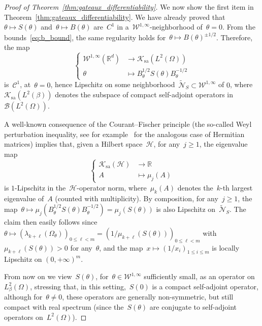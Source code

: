 \documentclass[a4]{article}
\newcommand{\R}{\mathbb{R}}
\newcommand{\1}{\mathbbm 1}
\newcommand{\Winf}{{{\cW}^{1,\infty}}}
\newcommand{\cW}{\mathcal{W}}
\begin{document}
\begin{proof}[Proof of Theorem~\ref{thm:gateaux_differentiability}]
    We now show the first item in Theorem~\ref{thm:gateaux_differentiability}. We have already proved that~$\theta\mapsto S(\theta)$ and~$\theta\mapsto B(\theta)$ are~$C^1$ in a~$\Winf$-neighborhood of~$\theta=0$. From the bounds~\eqref{eq:b_bound}, the same regularity holds for~$\theta\mapsto B(\theta)^{\pm1/2}$. Therefore, the map
    \begin{equation}
        \left\{\begin{aligned}\Winf(\R^d)&\to \mathcal K_{\mathrm{sa}}(L^2(\Omega))\\
            \theta&\mapsto B_\theta^{1/2}S(\theta)B_\theta^{-1/2}\end{aligned}\right.
    \end{equation}
    is~$\mathcal C^1$, at~$\theta=0$, hence Lipschitz on some neighborhood~$\widetilde{\mathcal N}_{S}\subset \Winf$ of $0$, where~$\mathcal K_{\mathrm{sa}}(L^2(\beta))$ denotes the subspace of compact self-adjoint operators in~$\mathcal B(L^2(\Omega))$.

    A well-known consequence of the Courant--Fischer principle (the so-called Weyl perturbation inequality, see for example~\cite[Section 1.3.3]{T12} for the analogous case of Hermitian matrices) implies that, given a Hilbert space~$\mathcal H$, for any~$j\geq 1$, the eigenvalue map
    \begin{equation}
        \left\{\begin{aligned} \mathcal K_{\mathrm{sa}}(\mathcal H)&\to \R\\
            A&\mapsto \mu_j(A)\end{aligned}\right.
    \end{equation}
    is $1$-Lipschitz in the~$\mathcal H$-operator norm, where~$\mu_k(A)$ denotes the~$k$-th largest eigenvalue of~$A$ (counted with multiplicity). By composition, for any~$j\geq 1$, the map~$\theta\mapsto \mu_j(B_\theta^{1/2}S(\theta)B_\theta^{-1/2}) = \mu_j(S(\theta))$ is also Lipschitz on~$\widetilde{\mathcal N}_S$.
    The claim then easily follows since~$\theta\mapsto\left(\lambda_{k+\ell}(\Omega_\theta)\right)_{0\leq \ell <m} = \left(1/\mu_{k+\ell}(S(\theta))\right)_{0\leq \ell <m}$ with~$\mu_{k+\ell}(S(\theta))>0$ for any~$\theta$, and the map~$x\mapsto \left(1/x_i\right)_{1\leq i\leq m}$ is locally Lipschitz on $\left(0,+\infty\right)^m$.
    
    From now on we view~$S(\theta)$, for~$\theta\in\Winf$ sufficiently small, as an operator on~$L_\beta^2(\Omega)$, stressing that, in this setting,~$S(0)$ is a compact self-adjoint operator, although for~$\theta\neq 0$, these operators are generally non-symmetric, but still compact with real spectrum (since the~$S(\theta)$ are conjugate to self-adjoint operators on~$L^2(\Omega)$).
    

\end{proof}
\end{document}
